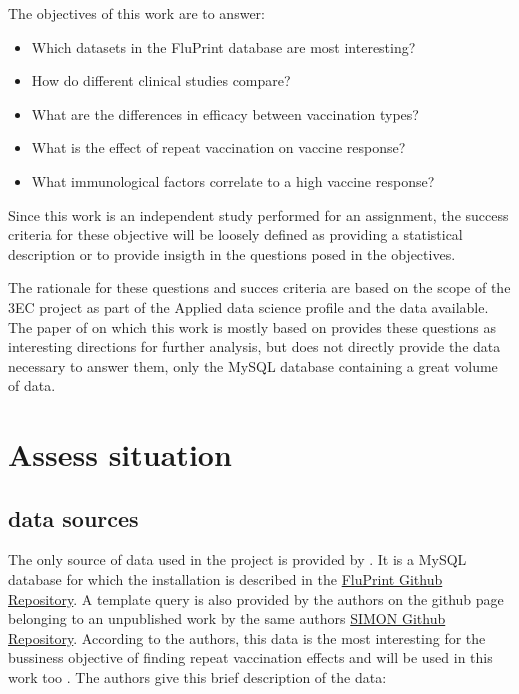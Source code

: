 The objectives of this work are to answer:
\begin{itemize}
        \item Which datasets in the FluPrint database are most interesting?
        \item How do different clinical studies compare?
        \item What are the differences in efficacy between vaccination types?
        \item What is the effect of repeat vaccination on vaccine response?
        \item What immunological factors correlate to a high vaccine response?
\end{itemize}

Since this work is an independent study performed for an assignment, the
success criteria for these objective will be loosely defined as providing a
statistical description or to provide insigth in the questions posed in the
objectives.

The rationale for these questions and succes criteria  are based on the scope
of the 3EC project as part of the Applied data science profile and the data
available. The paper of \cite{tomicFluPRINTDatasetMultidimensional2019} on
which this work is mostly based on provides these questions as interesting
directions for further analysis, but does not directly provide the data
necessary to answer them, only the MySQL database containing a great volume of
data.

\section{Assess situation}

\subsection{data sources}

The only source of data used in the project is provided by
\cite{tomicFluPRINTDatasetMultidimensional2019}. It is a MySQL database for
which the installation is described in the
\href{https://github.com/LogIN-/fluprint}{FluPrint Github Repository}. A
template query is also provided by the authors on the github page belonging to
an unpublished work by the same authors
\href{https://github.com/LogIN-/simon-manuscript}{SIMON Github Repository}.
According to the authors, this data is the most interesting for the bussiness
objective of finding repeat vaccination effects and will be used in this work
too \cite{tomicSIMONAutomatedMachine2019}. The authors give this brief
description of the data:

